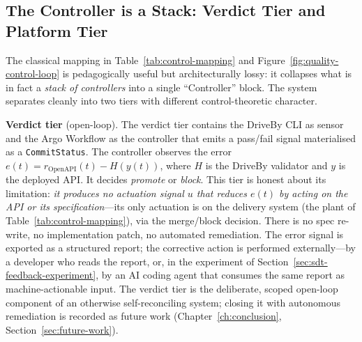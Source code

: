 \subsection{The Controller is a Stack: Verdict Tier and Platform Tier}
\label{subsec:controller-stack}

The classical mapping in Table~\ref{tab:control-mapping} and Figure~\ref{fig:quality-control-loop} is pedagogically useful but architecturally lossy: it collapses what is in fact a \emph{stack of controllers} into a single ``Controller'' block. The system separates cleanly into two tiers with different control-theoretic character.

\textbf{Verdict tier} (open-loop). The verdict tier contains the DriveBy CLI as sensor and the Argo Workflow as the controller that emits a pass/fail signal materialised as a \texttt{CommitStatus}. The controller observes the error $e(t) = r_{\text{OpenAPI}}(t) - H(y(t))$, where $H$ is the DriveBy validator and $y$ is the deployed API. It decides \emph{promote} or \emph{block}. This tier is honest about its limitation: \textit{it produces no actuation signal $u$ that reduces $e(t)$ by acting on the API or its specification}---its only actuation is on the delivery system (the plant of Table~\ref{tab:control-mapping}), via the merge/block decision. There is no spec re-write, no implementation patch, no automated remediation. The error signal is exported as a structured report; the corrective action is performed externally---by a developer who reads the report, or, in the experiment of Section~\ref{sec:sdt-feedback-experiment}, by an AI coding agent that consumes the same report as machine-actionable input. The verdict tier is the deliberate, scoped open-loop component of an otherwise self-reconciling system; closing it with autonomous remediation is recorded as future work (Chapter~\ref{ch:conclusion}, Section~\ref{sec:future-work}).

